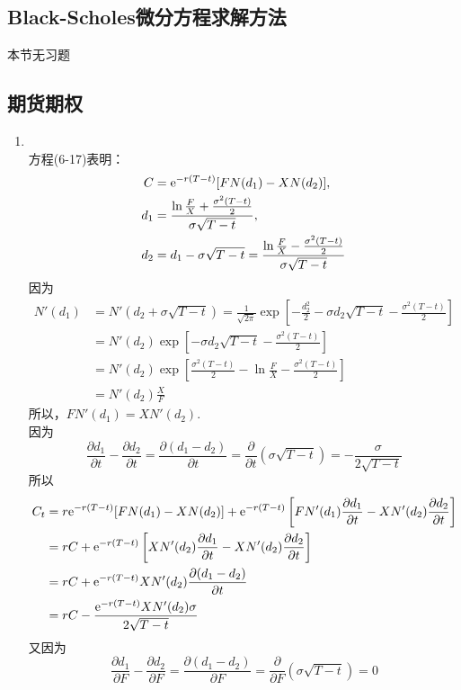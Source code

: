 \subsection{Black-Scholes微分方程求解方法}
本节无习题
\subsection{期货期权}
\begin{enumerate}
    \item \pro\\
    方程(6-17)表明：
    \begin{align*}
        C & = \mathrm{e}^{-r(T-t)}[FN(d_1)-XN(d_2)],\\
        d_1 & = \frac{\ln\frac{F}{X}+\frac{\sigma^2(T-t)}{2}}{\sigma \sqrt{T-t}},\\
        d_2 & = d_1 - \sigma \sqrt{T-t} = \frac{\ln\frac{F}{X}-\frac{\sigma^2(T-t)}{2}}{\sigma \sqrt{T-t}}
    \end{align*}
    因为
    \begin{align*}
        N'(d_1) & = N'(d_2 + \sigma \sqrt{T-t}) = \frac{1}{\sqrt{2\pi}}\exp\left[-\frac{d_2^2}{2}-\sigma d_2 \sqrt{T-t}-\frac{\sigma^2(T-t)}{2}\right]\\
        & = N'(d_2)\exp\left[-\sigma d_2 \sqrt{T-t}-\frac{\sigma^2(T-t)}{2}\right]\\
        & = N'(d_2)\exp\left[\frac{\sigma^2(T-t)}{2}-\ln\frac{F}{X}-\frac{\sigma^2(T-t)}{2}\right]\\
        & = N'(d_2)\frac{X}{F}
    \end{align*}
    所以，$FN'(d_1)=XN'(d_2)$.\\
    因为\[\frac{\partial d_1}{\partial t}-\frac{\partial d_2}{\partial t}=\frac{\partial (d_1-d_2)}{\partial t}=\frac{\partial }{\partial t}(\sigma\sqrt{T-t})=-\frac{\sigma}{2\sqrt{T-t}}\]
    所以
    \begin{align*}
        C_t & = r\mathrm{e}^{-r(T-t)}[FN(d_1)-XN(d_2)] + \mathrm{e}^{-r(T-t)}\left[FN'(d_1)\frac{\partial d_1}{\partial t}-XN'(d_2)\frac{\partial d_2}{\partial t}\right]\\
        & = rC + \mathrm{e}^{-r(T-t)}\left[XN'(d_2)\frac{\partial d_1}{\partial t}-XN'(d_2)\frac{\partial d_2}{\partial t}\right]\\
        & = rC+\mathrm{e}^{-r(T-t)}XN'(d_2)\frac{\partial (d_1-d_2)}{\partial t}\\
        & = rC-\frac{\mathrm{e}^{-r(T-t)}XN'(d_2)\sigma}{2\sqrt{T-t}}
    \end{align*}
    又因为\[\frac{\partial d_1}{\partial F}-\frac{\partial d_2}{\partial F}=\frac{\partial (d_1-d_2)}{\partial F}=\frac{\partial }{\partial F}(\sigma\sqrt{T-t})=0\]

\end{enumerate}
